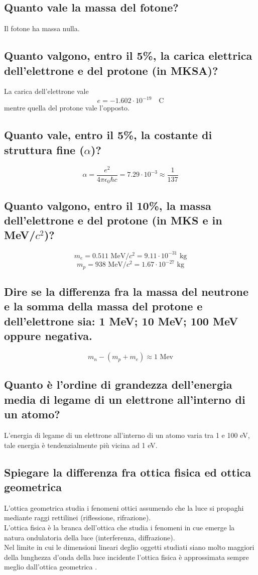\subsection[$\ $ Massa del fotone]{Quanto vale la massa del fotone?}
Il fotone ha massa nulla.
\subsection[$\ $ Carica elettrica dell'elettrone e del protone in MKSA]{Quanto valgono, entro il 5\%, la carica elettrica dell’elettrone e del protone (in MKSA)?}
La carica dell'elettrone vale 
\[
	e = -1.602 \cdot 10^{-19} \quad \text{C}
\]
 mentre quella del protone vale l'opposto. 

\subsection[$\ $ Costante di struttura fine $\alpha$]{Quanto vale, entro il 5\%, la costante di struttura fine ($\alpha$)?}
\[
	\alpha = \frac{e^{2}}{4\pi \epsilon_0 \hbar c} = 7.29 \cdot 10^{-3} \approx \frac{1}{137}
\] 	
\subsection[$\ $ Massa elettrone e protone]{Quanto valgono, entro il 10\%, la massa dell’elettrone e del protone (in MKS e in MeV/$c^2$)?}
\[
m_{e} = 0.511 \text{ MeV/$c^{2}$} = 9.11 \cdot 10^{-31} \text{ kg}
\] 
\[
m_{p} = 938 \text{ MeV/$c^{2}$} = 1.67 \cdot 10^{-27} \text{ kg}
\] 
\subsection[$\ $ Considerazione sulla massa del neutrone]{Dire se la differenza fra la massa del neutrone e la somma della massa del protone e dell’elettrone sia: 1 MeV; 10 MeV; 100 MeV oppure negativa.}
\[
	m_n - \left( m_p + m_e \right) \approx 1 \text{ Mev} 
\] 
\subsection[$\ $ Energia media di legame dell'elettrone atomico]{Quanto è l’ordine di grandezza dell’energia media di legame di un elettrone all’interno di un atomo?}
L'energia di legame di un elettrone all'interno di un atomo varia tra 1 e 100 eV, tale energia è tendenzialmente più vicina ad 1 eV.
\subsection[$\ $ Ottica fisica e ottica geometrica]{Spiegare la differenza fra ottica fisica ed ottica geometrica}
L'ottica geometrica studia i fenomeni ottici assumendo che la luce si propaghi mediante raggi rettilinei (riflessione, rifrazione).\\ 
L'ottica fisica è la branca dell'ottica che studia i fenomeni in cue emerge la natura ondulatoria della luce (interferenza, diffrazione).\\
Nel limite in cui le dimensioni lineari deglio oggetti studiati siano molto maggiori della lunghezza d'onda della luce incidente l'ottica fisica è approssimata sempre meglio dall'ottica geometrica .
